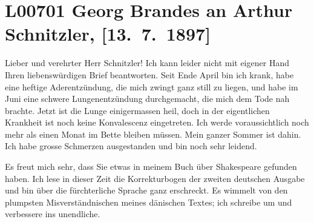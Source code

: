 

\section[Georg Brandes an Arthur Schnitzler, {[}13. 7. 1897{]}]{L00701 Georg Brandes an Arthur Schnitzler, {[}13. 7. 1897{]}}
\nopagebreak{}
\rehead{ }\normalsize\beginnumbering{}
\toendnotes[C]{\smallbreak\pagebreak[2]}
\toendnotes[C]{\smallbreak}
\toendnotes[C]{\smallbreak}
\pstart{}{\pb}Lieber und verehrter Herr
                  Schnitzler!\pend\vspace{0.5em}
\pstart
           Ich kann leider nicht mit eigener Hand Ihren liebenswürdigen Brief beantworten. Seit
                  Ende April bin ich krank, habe eine heftige Aderentzündung, die mich
               zwingt ganz still zu liegen, und habe im Juni eine schwere
               Lungenentzündung durchgemacht, die mich dem Tode nah brachte. Jetzt ist die Lunge
               einigermassen heil, doch in der eigentlichen Krankheit ist noch keine Konvalescenz
               eingetreten. Ich werde voraussichtlich noch mehr als einen Monat im Bette bleiben
               müssen. Mein ganzer Sommer ist dahin. Ich habe grosse Schmerzen ausgestanden und bin
               noch sehr leidend.\pend
           
\pstart
           Es freut mich sehr, dass Sie etwas in {\pb}meinem Buch über Shakespeare gefunden haben. Ich lese in dieser Zeit die Korrekturbogen der
               zweiten deutschen Ausgabe und bin über die fürchterliche Sprache ganz erschreckt. Es
               wimmelt von den plumpsten Misverständnischen meines dänischen Textes; ich schreibe um und verbessere ins unendliche.\pend
           
